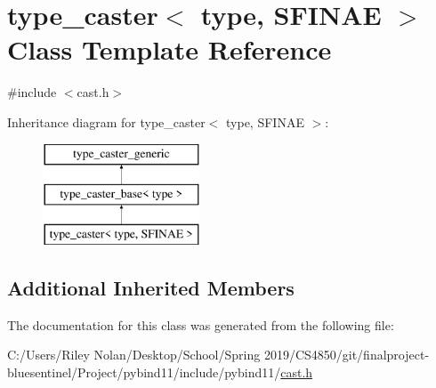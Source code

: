 \hypertarget{classtype__caster}{}\section{type\+\_\+caster$<$ type, S\+F\+I\+N\+AE $>$ Class Template Reference}
\label{classtype__caster}


{\ttfamily \#include $<$cast.\+h$>$}

Inheritance diagram for type\+\_\+caster$<$ type, S\+F\+I\+N\+AE $>$\+:\begin{figure}[H]
\begin{center}
\leavevmode
\includegraphics[height=3.000000cm]{classtype__caster}
\end{center}
\end{figure}
\subsection*{Additional Inherited Members}


The documentation for this class was generated from the following file\+:\begin{DoxyCompactItemize}
\item 
C\+:/\+Users/\+Riley Nolan/\+Desktop/\+School/\+Spring 2019/\+C\+S4850/git/finalproject-\/bluesentinel/\+Project/pybind11/include/pybind11/\mbox{\hyperlink{cast_8h}{cast.\+h}}\end{DoxyCompactItemize}
